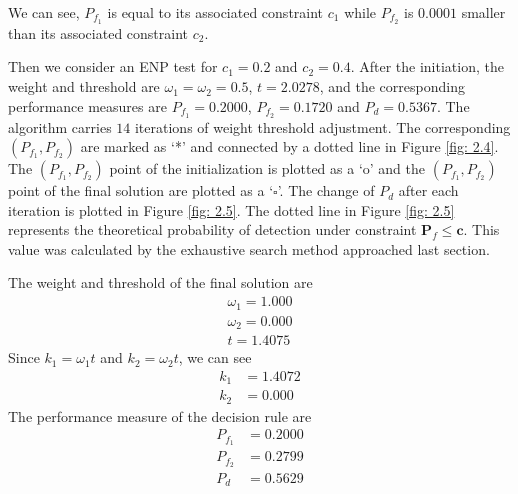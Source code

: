 We can see, $P_{f_1}$ is equal to its associated constraint $c_1$  while $P_{f_2}$ is $0.0001$ smaller than its associated  constraint $c_2$. 


Then we consider an ENP test for $c_1 = 0.2$ and $c_2 = 0.4$.
After the initiation, the weight and threshold are $\omega_1 = \omega_2 = 0.5$, $t =2.0278$, and the corresponding performance measures are $P_{f_1}  = 0.2000$, $P_{f_2} = 0.1720$ and $P_d = 0.5367$. The algorithm carries $14$ iterations of weight  threshold adjustment. The corresponding $(P_{f_1}, P_{f_2})$ are   
marked as `*' and connected by a dotted line in Figure \ref{fig: 2.4}. 
The $(P_{f_1}, P_{f_2})$ point of the initialization is plotted as  a `o' and the $(P_{f_1}, P_{f_2})$ point of the final solution are plotted as a `$\square$'. The change of $P_d$ after each iteration is plotted in Figure \ref{fig: 2.5}. 
The dotted line in Figure \ref{fig: 2.5} represents the theoretical probability of detection under constraint $\mathbf{P}_f \leq \mathbf{c}$. This value was calculated by the exhaustive search method approached last section.  


The weight and threshold of the final solution are
\[
\begin{split}
\omega_1 = 1.000\\
\omega_2 = 0.000\\
t = 1.4075
\end{split}
\]
Since $k_1 = \omega_1t$ and $k_2 = \omega_2t$, we can see
\[
\begin{split}
k_1 &= 1.4072\\
k_2 &= 0.000
\end{split}
\]
The performance measure of the decision rule are
\[
\begin{split}
P_{f_1} &= 0.2000\\
P_{f_2} &= 0.2799\\
P_d &= 0.5629
\end{split}
\]

